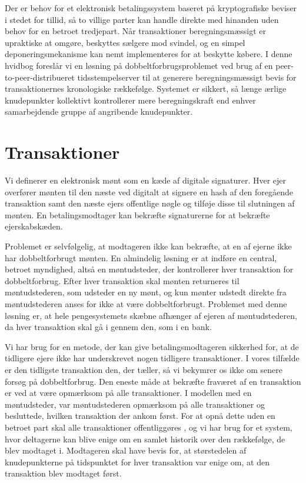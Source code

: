 \documentclass{article}
\begin{document}
Der er behov for et elektronisk betalingssystem baseret på kryptografiske beviser i stedet for tillid, så to villige parter kan handle direkte med hinanden uden behov for en
betroet tredjepart. Når transaktioner beregningsmæssigt er upraktiske at omgøre, beskyttes sælgere mod svindel, og en simpel deponeringsmekanisme kan nemt implementeres for at
beskytte købere. I denne hvidbog foreslår vi en løsning på dobbeltforbrugsproblemet ved brug af en peer-to-peer-distribueret tidsstempelserver til at generere beregningsmæssigt
bevis for transaktionernes kronologiske rækkefølge. Systemet er sikkert, så længe ærlige knudepunkter kollektivt kontrollerer mere beregningskraft end enhver samarbejdende gruppe
af angribende knudepunkter.

\section{Transaktioner}\label{sec:transactions}
Vi definerer en elektronisk mønt som en kæde af digitale signaturer. Hver ejer overfører mønten til den næste ved digitalt at signere en hash af den foregående transaktion samt
den næste ejers offentlige nøgle og tilføje disse til slutningen af mønten. En betalingsmodtager kan bekræfte signaturerne for at bekræfte ejerskabskæden.


\vspace{1em}

Problemet er selvfølgelig, at modtageren ikke kan bekræfte, at en af ejerne ikke har dobbeltforbrugt mønten. En almindelig løsning er at indføre en central, betroet myndighed,
altså en møntudsteder, der kontrollerer hver transaktion for dobbeltforbrug. Efter hver transaktion skal mønten returneres til møntudstederen, som udsteder en ny mønt, og kun
mønter udstedt direkte fra møntudstederen anses for ikke at være dobbeltforbrugt. Problemet med denne løsning er, at hele pengesystemets skæbne afhænger af ejeren af
møntudstederen, da hver transaktion skal gå i gennem den, som i en bank.

Vi har brug for en metode, der kan give betalingsmodtageren sikkerhed for, at de tidligere ejere ikke har underskrevet nogen tidligere transaktioner. I vores tilfælde er den
tidligste transaktion den, der tæller, så vi bekymrer os ikke om senere forsøg på dobbeltforbrug. Den eneste måde at bekræfte fraværet af en transaktion er ved at være opmærksom
på alle transaktioner. I modellen med en møntudsteder, var møntudstederen opmærksom på alle transaktioner og besluttede, hvilken transaktion der ankom først. For at opnå dette
uden en betroet part skal alle transaktioner offentliggøres \cite{dai1998money}, og vi har brug for et system, hvor deltagerne kan blive enige om en samlet historik over den
rækkefølge, de blev modtaget i. Modtageren skal have bevis for, at størstedelen af knudepunkterne på tidspunktet for hver transaktion var enige om, at den transaktion blev
modtaget først.
\end{document}
